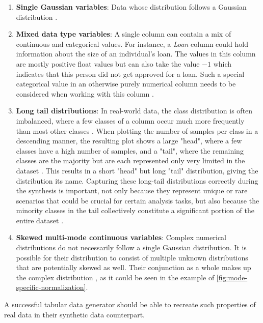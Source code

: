 \begin{enumerate}
    \item \textbf{Single Gaussian variables}: Data whose distribution follows a Gaussian distribution \cite{zhao2022CTABGANEnhancingTabular}.
    \item \textbf{Mixed data type variables}: A single column can contain a mix of continuous and categorical values. 
    For instance, a \textit{Loan} column could hold information about the size of an individual's loan.
    The values in this column are mostly positive float values but can also take the value \textit{$-1$} which indicates that this person did not get approved for a loan.
    Such a special categorical value in an otherwise purely numerical column needs to be considered when working with this column \cite{zhao2022CTABGANEnhancingTabular}.
    \item \textbf{Long tail distributions}: In real-world data, the class distribution is often imbalanced, where a few classes of a column occur much more frequently than most other classes \cite{zhang2023DeepLongTailedLearning}.
    When plotting the number of samples per class in a descending manner, the resulting plot shows a large "head", where a few classes have a high number of samples, and a "tail", where the remaining classes are the majority but are each represented only very limited in the dataset \cite[p. 2]{zhang2023DeepLongTailedLearning}.
    This results in a short "head" but long "tail" distribution, giving the distribution its name.
    Capturing these long-tail distributions correctly during the synthesis is important, not only because they represent unique or rare scenarios that could be crucial for certain analysis tasks, but also because the minority classes in the tail collectively constitute a significant portion of the entire dataset \cite{zhou2018DeepSuperclassLearning}. 
    \item \textbf{Skewed multi-mode continuous variables}: Complex numerical distributions do not necessarily follow a single Gaussian distribution.
    It is possible for their distribution to consist of multiple unknown distributions that are potentially skewed as well. 
    Their conjunction as a whole makes up the complex distribution \cite{zhao2022CTABGANEnhancingTabular}, as it could be seen in the example of \autoref{fig:mode-specific-normalization}.
\end{enumerate}

A successful tabular data generator should be able to recreate such properties of real data in their synthetic data counterpart.


